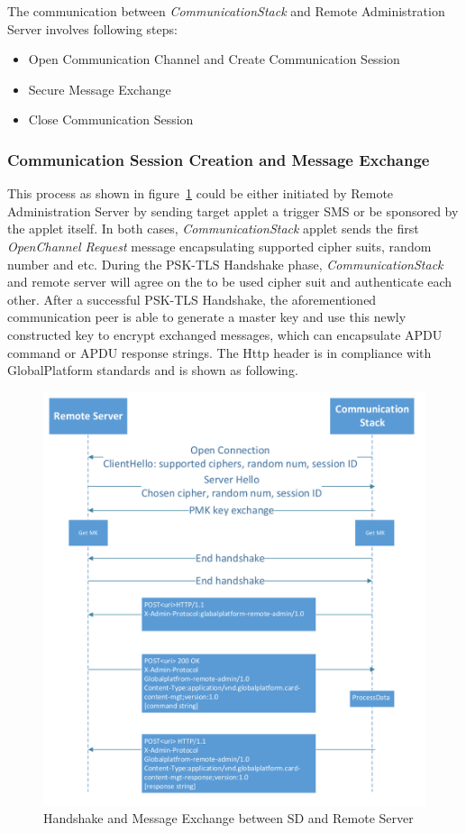 The communication between \emph{CommunicationStack} and Remote Administration Server involves following steps:

 \begin{itemize}
  \item Open Communication Channel and Create Communication Session
  \item Secure Message Exchange
  \item Close Communication Session
\end{itemize}
\subsubsection{Communication Session Creation and Message Exchange}
This process as shown in figure~\ref{fig:communication-flow} could be either initiated by Remote Administration Server by sending target applet a trigger SMS or be sponsored by the applet itself. In both cases, \emph{CommunicationStack} applet sends the first \emph{OpenChannel Request} message encapsulating supported cipher suits, random number and etc. During the PSK-TLS Handshake phase,    \emph{CommunicationStack} and remote server will agree on the to be used cipher suit and authenticate each other. After a successful PSK-TLS Handshake, the aforementioned communication peer is able to generate a master key and use this newly constructed key to encrypt exchanged messages, which can encapsulate APDU command or APDU response strings. The Http header is in compliance with GlobalPlatform standards and is shown as following.


\begin{figure}[!htb]
	\centering
	\includegraphics[width=1\textwidth]{communication-flow}
		\caption{Handshake and Message Exchange between SD and Remote Server}
	\label{fig:communication-flow}
\end{figure}


